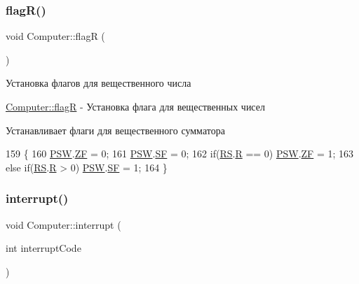 \subsubsection{\texorpdfstring{flag\+R()}{flagR()}}
{\footnotesize\ttfamily void Computer\+::flagR (\begin{DoxyParamCaption}{ }\end{DoxyParamCaption})\hspace{0.3cm}{\ttfamily [private]}}



Установка флагов для вещественного числа 

\hyperlink{class_computer_aae860bb217270ec88e8ebf6fe2c2adc9}{Computer\+::flagR} -\/ Установка флага для вещественных чисел

Устанавливает флаги для вещественного сумматора 
\begin{DoxyCode}
159 \{
160     \hyperlink{class_computer_aada011a29d87bb979835371a5f09805e}{PSW}.\hyperlink{struct_computer_1_1bits_a5307edeadd212f1fc19e9f6f5346df39}{ZF} = 0;
161     \hyperlink{class_computer_aada011a29d87bb979835371a5f09805e}{PSW}.\hyperlink{struct_computer_1_1bits_a74cfe87f17ba348db37c74bbd5e56828}{SF} = 0;
162     \textcolor{keywordflow}{if}(\hyperlink{class_computer_a874503110664b3cf821118d2ce9c2b96}{RS}.\hyperlink{union_computer_1_1data_acbf8c96e22bd094bcbb4014818e3570d}{R} == 0) \hyperlink{class_computer_aada011a29d87bb979835371a5f09805e}{PSW}.\hyperlink{struct_computer_1_1bits_a5307edeadd212f1fc19e9f6f5346df39}{ZF} = 1;
163     \textcolor{keywordflow}{else} \textcolor{keywordflow}{if}(\hyperlink{class_computer_a874503110664b3cf821118d2ce9c2b96}{RS}.\hyperlink{union_computer_1_1data_acbf8c96e22bd094bcbb4014818e3570d}{R} > 0) \hyperlink{class_computer_aada011a29d87bb979835371a5f09805e}{PSW}.\hyperlink{struct_computer_1_1bits_a74cfe87f17ba348db37c74bbd5e56828}{SF} = 1;
164 \}
\end{DoxyCode}
\hypertarget{class_computer_aa57b0ed2f3a9b168c2924174ec524bd4}{}\label{class_computer_aa57b0ed2f3a9b168c2924174ec524bd4} 
\subsubsection{\texorpdfstring{interrupt()}{interrupt()}}
{\footnotesize\ttfamily void Computer\+::interrupt (\begin{DoxyParamCaption}\item[{int}]{interrupt\+Code }\end{DoxyParamCaption})\hspace{0.3cm}{\ttfamily [private]}}



